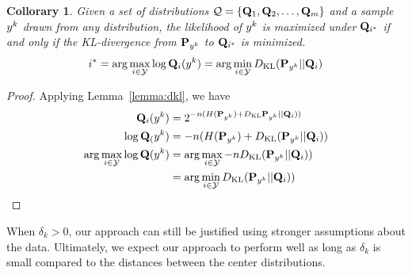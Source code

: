 \documentclass{article}
\newtheorem{collorary}[theorem]{Collorary}
\begin{document}
\begin{collorary}
\label{col:min_dkl}
Given a set of distributions $\mathcal{Q} = \{\mathbf{Q}_1,\mathbf{Q}_2, \ldots,
\mathbf{Q}_{m}\}$ and a sample $y^k$ drawn from any distribution, the
likelihood of $y^k$ is maximized under $\mathbf{Q}_{i^*}$ if and only if
the KL-divergence from $\mathbf{P}_{y^k}$ to $\mathbf{Q}_{i^*}$ is minimized.
\[
 i^* = \arg\max_{i \in \mathcal{Y}} \log \mathbf{Q}_i(y^k) = \arg\min_{i \in \mathcal{Y}} D_{\mathrm{KL}}(\mathbf{P}_{y^k}||\mathbf{Q}_i)
\]
\end{collorary}
\begin{proof}
  Applying Lemma~\ref{lemma:dkl}, we have
  \begin{align*}
    \mathbf{Q}_i(y^k) &= 2^{-n(H(\mathbf{P}_{y^k}) + D_{\mathrm{KL}}\mathbf{P}_{y^k} || \mathbf{Q}_i))}\\
    \log \mathbf{Q}_(y^k) &= -n(H(\mathbf{P}_{y^k}) + D_{\mathrm{KL}}(\mathbf{P}_{y^k} || \mathbf{Q}_i))\\
    \arg\max_{i \in \mathcal{Y}} \log \mathbf{Q}(y^k) &= \arg\max_{i \in \mathcal{Y}} - nD_{\mathrm{KL}}(\mathbf{P}_{y^k} || \mathbf{Q}_i))\\ 
    &= \arg\min_{i \in \mathcal{Y}} D_{\mathrm{KL}}(\mathbf{P}_{y^k} || \mathbf{Q}_i))\\
  \end{align*}
\end{proof}

\newcommand{\Qempjstar}{\widehat{\mathbf{Q}}_{(j^*,\trainset,k)}}

When $\delta_k > 0$, our approach can still be justified using
stronger assumptions about the data. Ultimately, we expect our
approach to perform well as long as $\delta_k$ is small compared to
the distances between the center distributions.

\end{document}
